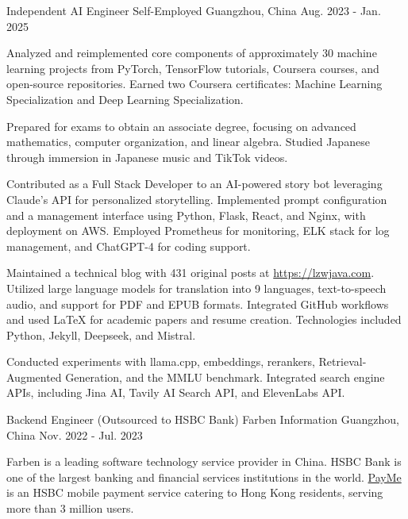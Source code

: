 \begin{cventries}
  \cventry
    {Independent AI Engineer} %
    {Self-Employed} %
    {Guangzhou, China} %
    {Aug. 2023 - Jan. 2025} %
    {
      \begin{cvitems} %
        \item {Analyzed and reimplemented core components of approximately 30 machine learning projects from PyTorch, TensorFlow tutorials, Coursera courses, and open-source repositories. Earned two Coursera certificates: Machine Learning Specialization and Deep Learning Specialization.}
        \item {Prepared for exams to obtain an associate degree, focusing on advanced mathematics, computer organization, and linear algebra. Studied Japanese through immersion in Japanese music and TikTok videos.}
        \item {Contributed as a Full Stack Developer to an AI-powered story bot leveraging Claude's API for personalized storytelling. Implemented prompt configuration and a management interface using Python, Flask, React, and Nginx, with deployment on AWS. Employed Prometheus for monitoring, ELK stack for log management, and ChatGPT-4 for coding support.}
        \item {Maintained a technical blog with 431 original posts at \url{https://lzwjava.com}. Utilized large language models for translation into 9 languages, text-to-speech audio, and support for PDF and EPUB formats. Integrated GitHub workflows and used LaTeX for academic papers and resume creation. Technologies included Python, Jekyll, Deepseek, and Mistral.}
        \item {Conducted experiments with llama.cpp, embeddings, rerankers, Retrieval-Augmented Generation, and the MMLU benchmark. Integrated search engine APIs, including Jina AI, Tavily AI Search API, and ElevenLabs API.}
      \end{cvitems}
    }
  \cventry
    {Backend Engineer (Outsourced to HSBC Bank)} %
    {Farben Information} %
    {Guangzhou, China} %
    {Nov. 2022 - Jul. 2023} %
    {
      \begin{cvitems} %
        \item {Farben is a leading software technology service provider in China. HSBC Bank is one of the largest banking and financial services institutions in the world. \href{https://payme.hsbc.com.hk/}{PayMe} is an HSBC mobile payment service catering to Hong Kong residents, serving more than 3 million users.}

\end{cvitems}}
\end{cventries}
